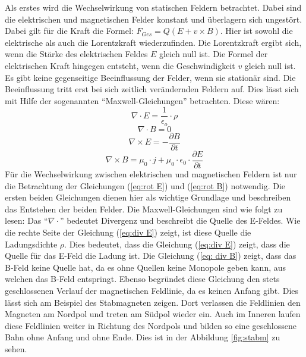 Als erstes wird die Wechselwirkung von statischen Feldern betrachtet.
Dabei sind die elektrischen und magnetischen Felder konstant und überlagern sich ungestört.
Dabei gilt für die Kraft die Formel: $F_{Ges} = Q (E + v \times B)$.
Hier ist sowohl die elektrische als auch die Lorentzkraft wiederzufinden.
Die Lorentzkraft ergibt sich, wenn die Stärke des elektrischen Feldes $E$ gleich null ist.
Die Formel der elektrischen Kraft hingegen entsteht, wenn die Geschwindigkeit $v$ gleich null ist.
Es gibt keine gegenseitige Beeinflussung der Felder, wenn sie stationär sind. 
Die Beeinflussung tritt erst bei sich zeitlich verändernden Feldern auf.
Dies lässt sich mit Hilfe der sogenannten "`Maxwell-Gleichungen"' betrachten.
Diese wären:
\begin{equation}
\label{eq:div E}
    \nabla \cdot E = \frac{1}{\epsilon_o} \cdot \rho
\end{equation}
\begin{equation}
\label{eq: div B}
    \nabla \cdot B = 0
\end{equation}
\begin{equation}
\label{eq:rot E}
    \nabla \times E = - \frac{\partial B}{\partial t}
\end{equation}
\begin{equation}
\label{eq:rot B}
    \nabla \times B = \mu_0 \cdot j + \mu_0 \cdot \epsilon_0 \cdot \frac{\partial E}{\partial t}
\end{equation}
Für die Wechselwirkung zwischen elektrischen und magnetischen Feldern ist nur die Betrachtung der Gleichungen (\ref{eq:rot E}) und (\ref{eq:rot B}) notwendig.
Die ersten beiden Gleichungen dienen hier als wichtige Grundlage und beschreiben das Entstehen der beiden Felder.
Die Maxwell-Gleichungen sind wie folgt zu lesen: 
Das "`$ \nabla \cdot$"' bedeutet Divergenz und beschreibt die Quelle des E-Feldes.
Wie die rechte Seite der Gleichung (\ref{eq:div E}) zeigt, ist diese Quelle die Ladungsdichte $\rho$.
Dies bedeutet, dass die Gleichung (\ref{eq:div E}) zeigt, dass die Quelle für das E-Feld die Ladung ist.
Die Gleichung (\ref{eq: div B}) zeigt, dass das B-Feld keine Quelle hat, da es ohne Quellen keine Monopole geben kann, aus welchen das B-Feld entspringt.
Ebenso begründet diese Gleichung den stets geschlossenen Verlauf der magnetischen Feldlinie, da es keinen Anfang gibt.
Dies lässt sich am Beispiel des Stabmagneten zeigen.
Dort verlassen die Feldlinien den Magneten am Nordpol und treten am Südpol wieder ein.
Auch im Inneren laufen diese Feldlinien weiter in Richtung des Nordpols und bilden so eine geschlossene Bahn ohne Anfang und ohne Ende.
Dies ist in der Abbildung \ref{fig:stabm} zu sehen.

